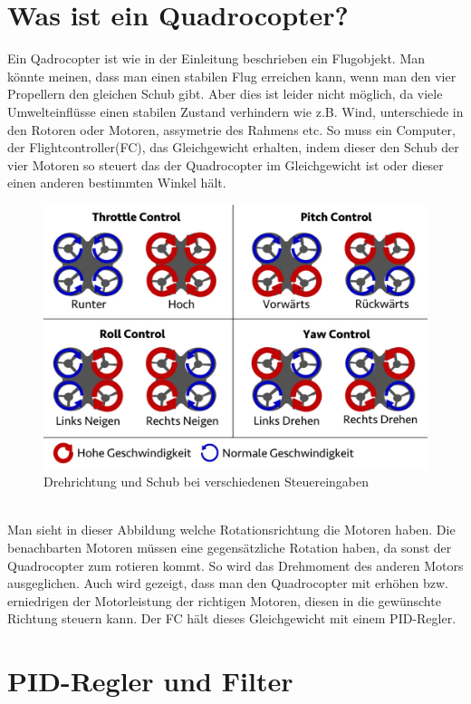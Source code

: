 \documentclass[12pt,a4paper, ngerman]{article}
\begin{document}
\section{Was ist ein Quadrocopter?}
Ein Qadrocopter ist wie in der Einleitung beschrieben ein Flugobjekt. Man könnte meinen, dass man einen stabilen Flug erreichen kann, wenn man den vier Propellern den gleichen Schub gibt. Aber dies ist leider nicht möglich, da viele Umwelteinflüsse einen stabilen Zustand verhindern wie z.B. Wind, unterschiede in den Rotoren oder Motoren, assymetrie des Rahmens etc. So muss ein Computer, der Flightcontroller(FC), das Gleichgewicht erhalten, indem dieser den Schub der vier Motoren so steuert das der Quadrocopter im Gleichgewicht ist oder dieser einen anderen bestimmten Winkel hält.\\
\begin{figure}[h]
\centering
\includegraphics[width=\textwidth]{MotionDE.jpg}
\caption[https://fpvracing.ch/de/content/7-grundsatzliche-funktion-quadrocopter-multicopter]{Drehrichtung und Schub bei verschiedenen Steuereingaben }
\end{figure}\\
Man sieht in dieser Abbildung welche Rotationsrichtung die Motoren haben. Die benachbarten Motoren müssen eine gegensätzliche Rotation haben, da sonst der Quadrocopter zum rotieren kommt. So wird das Drehmoment des anderen Motors ausgeglichen. Auch wird gezeigt, dass man den Quadrocopter mit erhöhen bzw. erniedrigen der Motorleistung der richtigen Motoren, diesen in die gewünschte Richtung steuern kann. Der FC hält dieses Gleichgewicht mit einem PID-Regler.


\section{PID-Regler und Filter}
\end{document}
